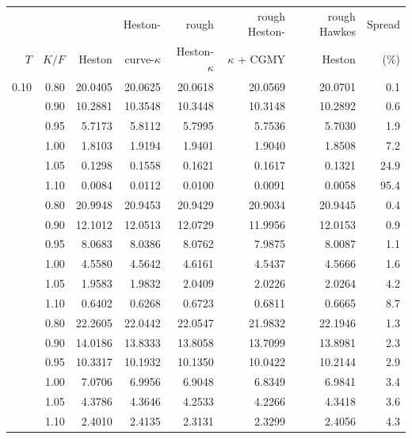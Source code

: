 \begin{tabular}{rrrrrrrr}
\toprule
 &  &  & Heston- & rough & rough Heston- & rough Hawkes & Spread\\
$T$ & $K/F$ & Heston & curve-$\kappa$ & Heston-$\kappa$ & $\kappa$ + CGMY & Heston & (\%)\\
\midrule
0.10 & 0.80 & 20.0405 & 20.0625 & 20.0618 & 20.0569 & 20.0701 & 0.1\\
 & 0.90 & 10.2881 & 10.3548 & 10.3448 & 10.3148 & 10.2892 & 0.6\\
 & 0.95 & 5.7173 & 5.8112 & 5.7995 & 5.7536 & 5.7030 & 1.9\\
 & 1.00 & 1.8103 & 1.9194 & 1.9401 & 1.9040 & 1.8508 & 7.2\\
 & 1.05 & 0.1298 & 0.1558 & 0.1621 & 0.1617 & 0.1321 & 24.9\\
 & 1.10 & 0.0084 & 0.0112 & 0.0100 & 0.0091 & 0.0058 & 95.4\\
\addlinespace
0.50 & 0.80 & 20.9948 & 20.9453 & 20.9429 & 20.9034 & 20.9445 & 0.4\\
 & 0.90 & 12.1012 & 12.0513 & 12.0729 & 11.9956 & 12.0153 & 0.9\\
 & 0.95 & 8.0683 & 8.0386 & 8.0762 & 7.9875 & 8.0087 & 1.1\\
 & 1.00 & 4.5580 & 4.5642 & 4.6161 & 4.5437 & 4.5666 & 1.6\\
 & 1.05 & 1.9583 & 1.9832 & 2.0409 & 2.0226 & 2.0264 & 4.2\\
 & 1.10 & 0.6402 & 0.6268 & 0.6723 & 0.6811 & 0.6665 & 8.7\\
\addlinespace
1.00 & 0.80 & 22.2605 & 22.0442 & 22.0547 & 21.9832 & 22.1946 & 1.3\\
 & 0.90 & 14.0186 & 13.8333 & 13.8058 & 13.7099 & 13.8981 & 2.3\\
 & 0.95 & 10.3317 & 10.1932 & 10.1350 & 10.0422 & 10.2144 & 2.9\\
 & 1.00 & 7.0706 & 6.9956 & 6.9048 & 6.8349 & 6.9841 & 3.4\\
 & 1.05 & 4.3786 & 4.3646 & 4.2533 & 4.2266 & 4.3418 & 3.6\\
 & 1.10 & 2.4010 & 2.4135 & 2.3131 & 2.3299 & 2.4056 & 4.3\\
\bottomrule
\end{tabular}

